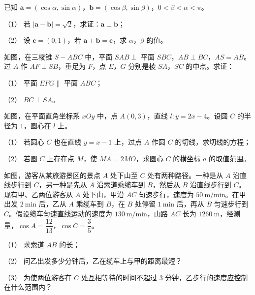 \begin{question}
已知 $\boldsymbol a=(\cos\alpha,\sin\alpha)$，$\boldsymbol b=(\cos\beta,\sin\beta)$，$0<\beta<\alpha<\pi$。

（1） 若 $|\boldsymbol a-\boldsymbol b|=\sqrt2$，求证：$\boldsymbol a\perp\boldsymbol b$；

（2） 设 $\boldsymbol c=(0,1)$，若 $\boldsymbol a+\boldsymbol b=\boldsymbol c$，求 $\alpha$，$\beta$ 的值。

\Needspace{0.4\textheight}
\end{question}
\begin{question}
如图，在三棱锥 $S-ABC$ 中，平面 $SAB\perp$ 平面 $SBC$，$AB\perp BC$，$AS=AB$。过 $A$ 作 $AF\perp SB$，垂足为 $F$，点 $E$，$G$ 分别是棱 $SA$，$SC$ 的中点。求证：

（1） 平面 $EFG\parallel$ 平面 $ABC$；

（2） $BC\perp SA$。
\nopagebreak[4]
\begin{center}\end{center}
\nopagebreak[4]
\Needspace{0.4\textheight}
\end{question}
\begin{question}
如图，在平面直角坐标系 $xOy$ 中，点 $A(0,3)$，直线 $l:y=2x-4$。设圆 $C$ 的半径为 $1$，圆心在 $l$ 上。

（1） 若圆心 $C$ 也在直线 $y=x-1$ 上，过点 $A$ 作圆 $C$ 的切线，求切线的方程；

（2） 若圆 $C$ 上存在点 $M$，使 $MA=2MO$，求圆心 $C$ 的横坐标 $a$ 的取值范围。
\nopagebreak[4]
\begin{center}\end{center}
\nopagebreak[4]
\Needspace{0.4\textheight}
\end{question}
\begin{question}
如图，游客从某旅游景区的景点 $A$ 处下山至 $C$ 处有两种路径。一种是从 $A$ 沿直线步行到 $C$，另一种是先从 $A$ 沿索道乘缆车到 $B$，然后从 $B$ 沿直线步行到 $C$。现有甲、乙两位游客从 $A$ 处下山，甲沿 $AC$ 匀速步行，速度为 $50\ \mathrm{m/min}$。在甲出发 $2\ \mathrm{min}$ 后，乙从 $A$ 乘缆车到 $B$，在 $B$ 处停留 $1\ \mathrm{min}$ 后，再从 $B$ 匀速步行到 $C$。假设缆车匀速直线运动的速度为 $130\ \mathrm{m/min}$，山路 $AC$ 长为 $1260\ \mathrm{m}$，经测量，$\cos A=\dfrac{12}{13}$，$\cos C=\dfrac35$。

（1） 求索道 $AB$ 的长；

（2） 问乙出发多少分钟后，乙在缆车上与甲的距离最短？

（3） 为使两位游客在 $C$ 处互相等待的时间不超过 $3$ 分钟，乙步行的速度应控制在什么范围内？
\nopagebreak[4]
\begin{center}\end{center}
\nopagebreak[4]
\end{question}

